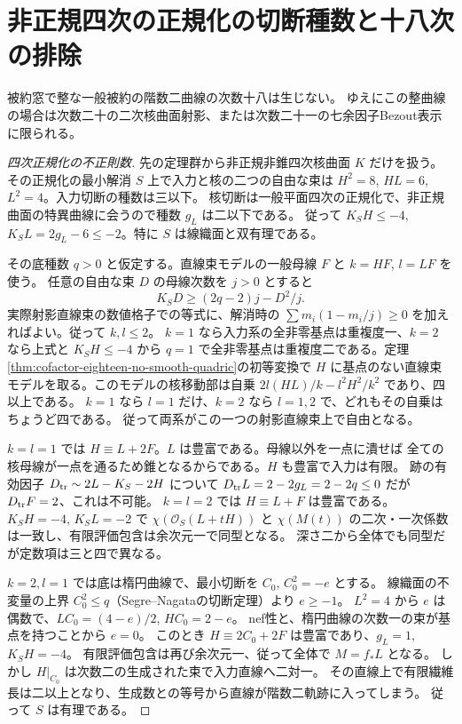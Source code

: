 \section{非正規四次の正規化の切断種数と十八次の排除}
\label{sec:cofactor-eighteen-quartic-normalization}
\begin{theorem}\label{thm:cofactor-exclude-eighteen}
被約窓で整な一般被約の階数二曲線の次数十八は生じない。
ゆえにこの整曲線の場合は次数二十の二次核曲面射影、または次数二十一の七余因子Bezout表示に限られる。
\end{theorem}
\begin{proof}[四次正規化の不正則数]
先の定理群から非正規非錐四次核曲面 $K$ だけを扱う。
その正規化の最小解消 $S$ 上で入力と核の二つの自由な束は
$H^2=8$, $HL=6$, $L^2=4$。入力切断の種数は三以下。
核切断は一般平面四次の正規化で、非正規曲面の特異曲線に会うので種数 $g_L$ は二以下である。
従って $K_S H\le-4$, $K_S L=2g_L-6\le-2$。特に $S$ は線織面と双有理である。

その底種数 $q>0$ と仮定する。直線束モデルの一般母線 $F$ と $k=HF$, $l=LF$ を使う。
任意の自由な束 $D$ の母線次数を $j>0$ とすると
\[
 K_S D\ge(2q-2)j-D^2/j .
\]
実際射影直線束の数値格子での等式に、解消時の
$\sum m_i(1-m_i/j)\ge0$ を加えればよい。従って $k,l\le2$。
$k=1$ なら入力系の全非零基点は重複度一、$k=2$ なら上式と $K_SH\le-4$ から
$q=1$ で全非零基点は重複度二である。定理\ref{thm:cofactor-eighteen-no-smooth-quadric}の初等変換で
$H$ に基点のない直線束モデルを取る。このモデルの核移動部は自乗
$2l(HL)/k-l^2 H^2/k^2$ であり、四以上である。
$k=1$ なら $l=1$ だけ、$k=2$ なら $l=1,2$ で、どれもその自乗はちょうど四である。
従って両系がこの一つの射影直線束上で自由となる。

$k=l=1$ では $H\equiv L+2F$。$L$ は豊富である。母線以外を一点に潰せば
全ての核母線が一点を通るため錐となるからである。$H$ も豊富で入力は有限。
跡の有効因子 $D_{\rm tr}\sim2L-K_S-2H$ について
$D_{\rm tr}L=2-2g_L=2-2q\le0$ だが $D_{\rm tr}F=2$、これは不可能。
$k=l=2$ では $H\equiv L+F$ は豊富である。$K_SH=-4$, $K_SL=-2$ で
$\chi(\mathcal O_S(L+tH))$ と $\chi(M(t))$ の二次・一次係数は一致し、有限評価包含は余次元一で同型となる。
深さ二から全体でも同型だが定数項は三と四で異なる。

$k=2,l=1$ では底は楕円曲線で、最小切断を $C_0$, $C_0^2=-e$ とする。
線織面の不変量の上界 $C_0^2\le q$（Segre--Nagataの切断定理）より $e\ge-1$。
$L^2=4$ から $e$ は偶数で、$LC_0=(4-e)/2$, $HC_0=2-e$。
nef性と、楕円曲線の次数一の束が基点を持つことから $e=0$。
このとき $H\equiv2C_0+2F$ は豊富であり、$g_L=1$, $K_SH=-4$。
有限評価包含は再び余次元一、従って全体で $M=f_*L$ となる。
しかし $H|_{C_0}$ は次数二の生成された束で入力直線へ二対一。
その直線上で有限繊維長は二以上となり、生成数との等号から直線が階数二軌跡に入ってしまう。
従って $S$ は有理である。
\end{proof}

